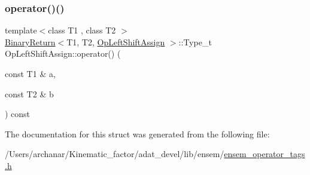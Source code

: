 \mbox{\label{structOpLeftShiftAssign_a1606d84ca8d3445b33cbf098a7c3667e}} 
\subsubsection{\texorpdfstring{operator()()}{operator()()}\hspace{0.1cm}{\footnotesize\ttfamily [2/2]}}
{\footnotesize\ttfamily template$<$class T1 , class T2 $>$ \\
\mbox{\hyperlink{structBinaryReturn}{Binary\+Return}}$<$T1, T2, \mbox{\hyperlink{structOpLeftShiftAssign}{Op\+Left\+Shift\+Assign}} $>$\+::Type\+\_\+t Op\+Left\+Shift\+Assign\+::operator() (\begin{DoxyParamCaption}\item[{const T1 \&}]{a,  }\item[{const T2 \&}]{b }\end{DoxyParamCaption}) const\hspace{0.3cm}{\ttfamily [inline]}}



The documentation for this struct was generated from the following file\+:\begin{DoxyCompactItemize}
\item 
/\+Users/archanar/\+Kinematic\+\_\+factor/adat\+\_\+devel/lib/ensem/\mbox{\hyperlink{lib_2ensem_2ensem__operator__tags_8h}{ensem\+\_\+operator\+\_\+tags.\+h}}\end{DoxyCompactItemize}
